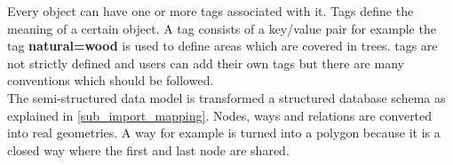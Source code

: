 Every object can have one or more tags associated with it. Tags define the meaning of a certain object. A tag consists of a key/value pair for example the tag \textbf{natural=wood} is used to define areas which are covered in trees. \osm{} tags are not strictly defined and users can add their own tags but there are many conventions which should be followed.\\

The semi-structured \osm{} data model is transformed a structured database schema as explained in \autoref{sub_import_mapping}. Nodes, ways and relations are converted into real geometries.
A way for example is turned into a polygon because it is a closed way where the first and last node are shared\cite{13_osm_wiki_closed_way}.